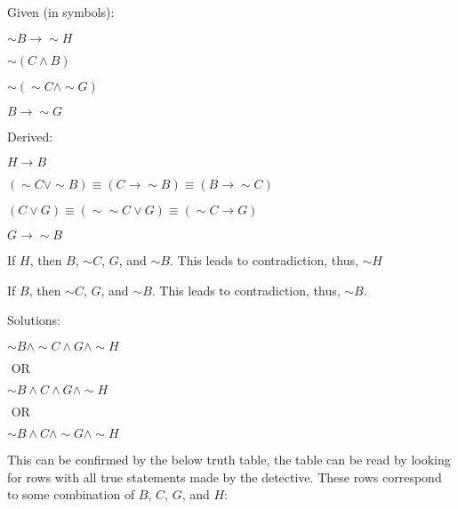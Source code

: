 \documentclass{article}
\newenvironment{Solution}
{\noindent\color{red}}
{\newline}
\begin{document}
\begin{Solution}
    Given (in symbols):
    \begin{adjustwidth}{2em}{0em}
        $\sim B \rightarrow \sim H$

        $\sim (C \land B)$

        $\sim (\sim C \land \sim G)$

        $B \rightarrow \sim G$
    \end{adjustwidth}

    \phantom{ }

    Derived:

    \begin{adjustwidth}{2em}{0em}
        $H \rightarrow B$

        $(\sim C \lor \sim B) \equiv (C \rightarrow \sim B) \equiv (B \rightarrow \sim C)$

        $(C \lor G) \equiv (\sim \sim C \lor G) \equiv (\sim C \rightarrow G)$

        $G \rightarrow \sim B$
    \end{adjustwidth}

    If $H$, then $B$, $\sim C$, $G$, and $\sim B$.
    This leads to contradiction, thus, $\sim H$

    If $B$, then $\sim C$, $G$, and $\sim B$.
    This leads to contradiction, thus, $\sim B$.

    \phantom{ }

    Solutions:

    \begin{adjustwidth}{2em}{0em}
        $\sim B \land \sim C \land G \land \sim H$

        \hspace*{3.75em}$\text{ OR }$

        $\sim B \land C \land G \land \sim H$

        \hspace*{3.75em}$\text{ OR }$

        $\sim B \land C \land \sim G \land \sim H$
    \end{adjustwidth}

    This can be confirmed by the below truth table, the table
    can be read by looking for rows with all true statements
    made by the detective. These rows correspond to some combination
    of $B$, $C$, $G$, and $H$:


\end{Solution}
\end{document}
